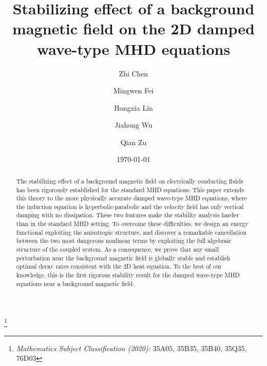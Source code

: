 \documentclass[reqno,11pt]{amsart}
\date{\today}
\def\subjclass#1{{\renewcommand{\thefootnote}{}
\footnote{\emph{Mathematics Subject Classification (2020):} #1}}}
\numberwithin{Thm}{section}
\begin{document}
\large


\title[Damped wave-type magnetohydrodynamic equations]
{Stabilizing effect of a background magnetic field on the 2D damped wave-type MHD equations}




\author[]{Zhi Chen}
\address{Zhi Chen: School of Mathematics and Statistics, Anhui Normal University, Wuhu 241002, People's Republic of China }
%

\author[]{Mingwen Fei}
\address{Mingwen Fei: School of Mathematics and Statistics, Anhui Normal University, Wuhu 241002, People's Republic of China}
%

\author[]{Hongxia Lin }
\address{Hongxia Lin: School of Mathematical Sciences，Chengdu University of Technology, Chengdu, 610059, People's Republic of China}

\author[]{Jiahong Wu }
\address{Jiahong Wu: Department of Mathematics, University of Notre Dame, Notre Dame, IN 46556, USA}

\author[]{Qian Zu}
\address{Qian Zu: School of Mathematics and Statistics, Anhui Normal University, Wuhu 241002, People's Republic of China}


\subjclass{35A05, 35B35, 35B40, 35Q35, 76D03}

\begin{abstract}
	The stabilizing effect of a background magnetic field on electrically conducting fluids has been rigorously established for the standard MHD equations. This paper extends this theory to the more physically accurate damped wave-type MHD equations, where the induction equation is hyperbolic-parabolic and the velocity field has only vertical damping with no dissipation. These two features make the stability analysis harder than in the standard MHD setting. To overcome these difficulties,
	we design an energy functional exploiting the anisotropic structure, and
	discover a remarkable cancellation between the two most dangerous nonlinear terms by
	exploiting the full algebraic structure of the coupled system. As a consequence, we
	prove that any small perturbation near the background magnetic field is globally stable
	and establish optimal decay rates consistent with the 2D heat equation. To the
	best of our knowledge, this is the first rigorous stability result for the damped
	wave-type MHD equations near a background magnetic field.
\end{abstract}
\end{document}
